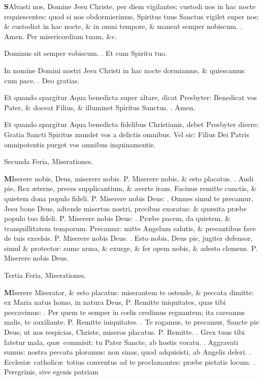\documentclass[letter,11pt]{book}
\makeatletter
\DeclareRobustCommand{\Vbar}{\vers@resp{-0.1em}{V}}
\DeclareRobustCommand{\Rbar}{\vers@resp{0pt}{R}}
\newcommand{\vers@resp@sym}{\raisebox{0.2ex}{\rotatebox[origin=c]{-20}{$\m@th\rceil$}}}
\newcommand{\vers@resp}[2]{%
  {\ooalign{\hidewidth\kern#1\vers@resp@sym\hidewidth\cr#2\cr}}%
}%
\def\P{\color{Red} P. \color{black}}
\def\V{\color{Red} \Vbar . \color{black}}
\def\R{\color{Red} \Rbar . \color{black}}
\makeatother
\begin{document}
\begin{multicols*}{2}
\lettrine[lines=2]{\bfseries \color{Red} S}{}Alvasti nos, Domine Jesu Christe, per diem vigilantes; custodi nos in hac nocte requiescentes: quod si nos obdormierimus, Spiritus tuus Sanctus vigilet super nos; \& custodiat in hac nocte, \& in omni tempore, \& maneat semper nobiscum. \R Amen. Per misericordiam tuam, \&c.
\par Dominus sit semper vobiscum. \R Et cum Spiritu tuo.
\par In nomine Domini nostri Jesu Christi in hac nocte dormiamus, \& quiescamus cum pace. \R Deo gratias.
\par \color{Red} Et quando spargitur Aqua benedicta super altare, dicat Presbyter: \color{black} Benedicat vos Pater, \& doceat Filius, \& illuminet Spiritus Sanctus. \R Amen.
\par \color{Red} Et quando spargitur Aqua benedicta fidelibus Christianis, debet Presbyter dicere: \color{black} Gratia Sancti Spiritus mundet vos a delictis omnibus. \color{Red} Vel sic: \color{black} Filius Dei Patris omnipotentis purget vos omnibus inquinamentis.
\vspace{-.5em} \begin{center} \color{Red} Secunda Feria, Miserationes. \end{center} \vspace{-.5em}
\lettrine[lines=2]{\bfseries \color{Red} M}{}Iserere nobis, Deus, miserere nobis. \P Miserere nobis, \& esto placatus. \V Audi pie, Rex \ae terne, preces supplicantium, \& averte iram. Facinus remitte cunctis, \& quietem dona populo fideli. \P Miserere nobis Deus: \V Omnes simul te precamur, Jesu bone Deus, adtende misertus nostri, precibus exoratus: \& qu\ae sita pr\ae be populo tuo fideli. \P Miserere nobis Deus: \V Pr\ae be pacem, da quietem, \& tranquillitatem temporum. Precamur: mitte Angelum salutis, \& precantibus fave de tuis excelsis. \P Miserere nobis Deus. \V Esto nobis, Deus pie, jugiter defensor, simul \& protector: sume arma, \& exurge, \& fer opem nobis, \& adesto clemens. \P Miserere nobis Deus.
\vspace{-.5em} \begin{center} \color{Red} Tertia Feria, Miserationes. \end{center} \vspace{-.5em}
\lettrine[lines=2]{\bfseries \color{Red} M}{}Iserere Miserator, \& esto placatus: miserantem te ostende, \& peccata dimitte: ex Maria natus homo, in natura Deus, \P Remitte iniquitates, quas tibi peccavimus: \V Per quem te semper in c\oe lis credimus regnantem; ita careamus malis, te auxiliante. \P Remitte iniquitates. \V Te rogamus, te precamur, Sancte pie Deus; ut nos respicias, Christe, miseros placatus. \P Remitte. \V Grex tuus tibi fatetur mala, qu\ae \ commisit: tu Pater Sancte, ab hostis voratu. \V Aggravati sumus: nostra peccata ploramus: non sinas, quod adquisisti, ab Angelis deleri. \V Ecclesi\ae \ catholic\ae \ totius conventus ad te proclamantes: pr\ae be pietatis locum. \V Peregrinis, sive egenis patriam

\end{multicols*}
\end{document}
